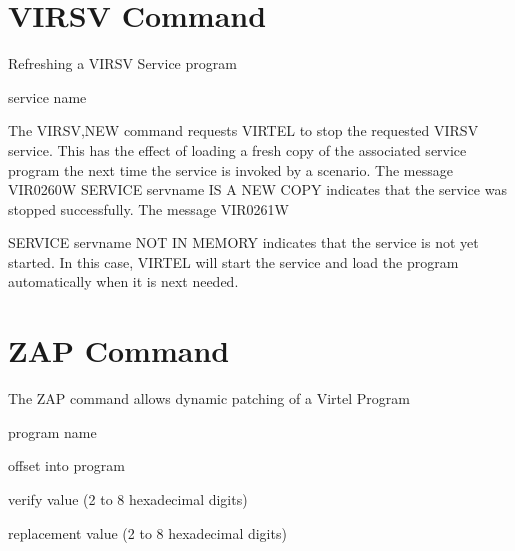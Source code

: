 \documentclass[letterpaper,10pt,english]{sphinxmanual}
\begin{document}
\section{VIRSV Command}
\label{\detokenize{audit_operations_ and_performance:virsv-command}}\label{\detokenize{audit_operations_ and_performance:index-33}}
\sphinxAtStartPar
Refreshing a VIRSV Service program

\begin{sphinxVerbatim}[commandchars=\\\{\}]
\end{sphinxVerbatim}
\begin{description}
\sphinxAtStartPar
service name

\end{description}

\sphinxAtStartPar
The VIRSV,NEW command requests VIRTEL to stop the requested VIRSV service. This has the effect of loading a fresh copy of the associated service program the next time the service is invoked by a scenario. The message VIR0260W SERVICE servname IS A NEW COPY indicates that the service was stopped successfully. The message VIR0261W

\sphinxAtStartPar
SERVICE servname NOT IN MEMORY indicates that the service is not yet started. In this case, VIRTEL will start the service and load the  program automatically when it is next needed.

\ignorespaces 

\section{ZAP Command}
\label{\detokenize{audit_operations_ and_performance:zap-command}}\label{\detokenize{audit_operations_ and_performance:index-34}}
\sphinxAtStartPar
The ZAP command allows dynamic patching of a Virtel Program

\begin{sphinxVerbatim}[commandchars=\\\{\}]
\end{sphinxVerbatim}
\begin{description}
\sphinxAtStartPar
program name

\sphinxAtStartPar
offset into program

\sphinxAtStartPar
verify value (2 to 8 hexadecimal digits)

\sphinxAtStartPar
replacement value (2 to 8 hexadecimal digits)

\end{description}
\end{document}
